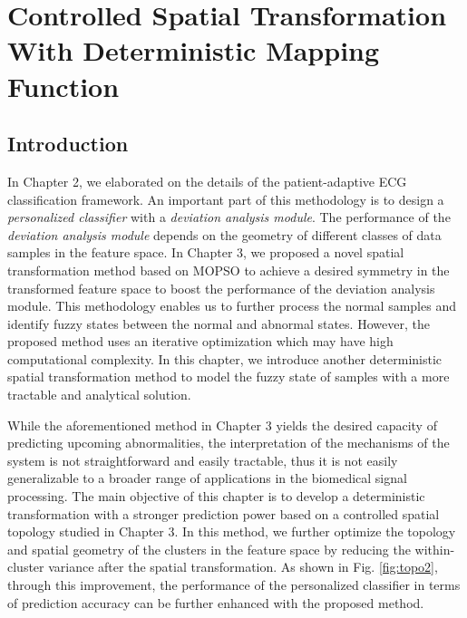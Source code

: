 \chapter{Controlled Spatial Transformation With Deterministic Mapping Function}
\section{Introduction}


 In Chapter 2, we elaborated on the details of the patient-adaptive ECG classification framework. An important part of this methodology is to design a \textit{personalized classifier} with a \textit{deviation analysis module}. The performance of the \textit{deviation analysis module} depends on the geometry of different classes of data samples in the feature space. In Chapter 3, we proposed a novel spatial transformation method based on MOPSO to  achieve a desired symmetry in the transformed feature space to boost the performance of the deviation analysis module. This methodology enables us to further process the normal samples and identify fuzzy states between the normal and abnormal states. However, the proposed method uses an iterative optimization which may have high computational complexity. In this chapter, we introduce another deterministic spatial transformation method to model the fuzzy state of samples with a more tractable and analytical solution. %

 
While the aforementioned method in Chapter 3 yields the desired capacity of predicting upcoming abnormalities, the interpretation of the mechanisms of the system is not straightforward and easily tractable, thus it is not easily generalizable to a broader range of applications in the biomedical signal processing. The main objective of this chapter is to develop a deterministic transformation with a stronger prediction power based on a controlled spatial topology studied in Chapter 3. In this method, we further optimize the topology and spatial geometry of the clusters in the feature space by reducing the within-cluster variance after the spatial transformation. As shown in Fig. \ref{fig:topo2}, through this improvement, the performance of the personalized classifier in terms of prediction accuracy can be further enhanced with the proposed method.
 
